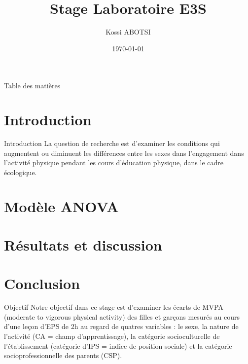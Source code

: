 \documentclass{beamer}
\title{Stage Laboratoire E3S}
\author{Kossi ABOTSI}
\date{\today}
\begin{document}
	\begin{frame}[plain]
		\maketitle
	\end{frame}
	
	\begin{frame}{Table des matières}
		\tableofcontents
	\end{frame}
	
	\section{Introduction}
	\begin{frame}{Introduction}
		La question de recherche est d'examiner les conditions qui augmentent ou diminuent les différences entre les sexes dans l'engagement dans l'activité physique pendant les cours d'éducation physique, dans le cadre écologique.
	\end{frame}
	\section{Modèle ANOVA}
	\section{Résultats et discussion}
	\section{Conclusion}
	
	\begin{frame}{Objectif}
		 Notre objectif dans ce stage est d'examiner les écarts de MVPA (moderate to vigorous physical activity) des filles et garçons mesurés au cours d'une leçon d'EPS de 2h au regard de quatres variables : le sexe, la nature de l'activité (CA = champ d'apprentissage), la catégorie socioculturelle de l'établissement (catégorie d'IPS = indice de position sociale) et la catégorie socioprofessionnelle des parents (CSP).
	\end{frame}
	
\end{document}
